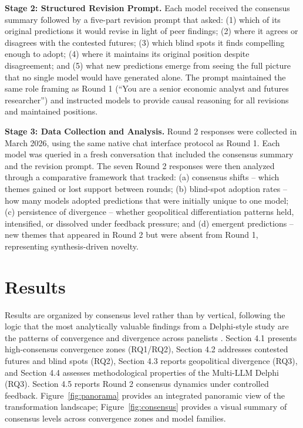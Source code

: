 \documentclass[preprint,review,12pt]{elsarticle}
\begin{document}
\textbf{Stage 2: Structured Revision Prompt.} Each model received the consensus summary followed by a five-part revision prompt that asked: (1) which of its original predictions it would revise in light of peer findings; (2) where it agrees or disagrees with the contested futures; (3) which blind spots it finds compelling enough to adopt; (4) where it maintains its original position despite disagreement; and (5) what new predictions emerge from seeing the full picture that no single model would have generated alone. The prompt maintained the same role framing as Round 1 (``You are a senior economic analyst and futures researcher'') and instructed models to provide causal reasoning for all revisions and maintained positions.

\textbf{Stage 3: Data Collection and Analysis.} Round 2 responses were collected in March 2026, using the same native chat interface protocol as Round 1. Each model was queried in a fresh conversation that included the consensus summary and the revision prompt. The seven Round 2 responses were then analyzed through a comparative framework that tracked: (a) consensus shifts -- which themes gained or lost support between rounds; (b) blind-spot adoption rates -- how many models adopted predictions that were initially unique to one model; (c) persistence of divergence -- whether geopolitical differentiation patterns held, intensified, or dissolved under feedback pressure; and (d) emergent predictions -- new themes that appeared in Round 2 but were absent from Round 1, representing synthesis-driven novelty.


\section{Results}
\label{sec:results}

Results are organized by consensus level rather than by vertical, following the logic that the most analytically valuable findings from a Delphi-style study are the patterns of convergence and divergence across panelists \citep{vondergracht2012delphi}. Section 4.1 presents high-consensus convergence zones (RQ1/RQ2), Section 4.2 addresses contested futures and blind spots (RQ2), Section 4.3 reports geopolitical divergence (RQ3), and Section 4.4 assesses methodological properties of the Multi-LLM Delphi (RQ3). Section 4.5 reports Round 2 consensus dynamics under controlled feedback. Figure~\ref{fig:panorama} provides an integrated panoramic view of the transformation landscape; Figure~\ref{fig:consensus} provides a visual summary of consensus levels across convergence zones and model families.
\end{document}
